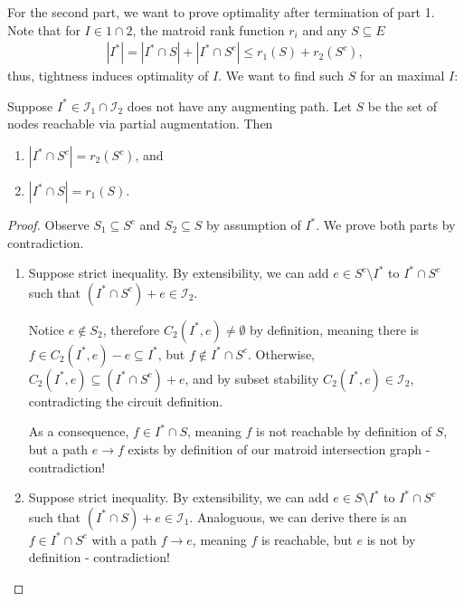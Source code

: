 For the second part, we want to prove optimality after termination of part 1.
Note that for $I \in \mathcal 1 \cap \mathcal 2$, the matroid rank function $r_i$ and any $S \subseteq E$
\begin{align*}
    |I^*| = |I^* \cap S| + |I^* \cap S^c| \leq r_1(S) + r_2(S^c),
\end{align*}
thus, tightness induces optimality of $I$. We want to find such $S$ for an maximal $I$:
\begin{lemma}
    Suppose $I^* \in \mathcal I_1 \cap \mathcal I_2$ does not have any augmenting path.
    Let $S$ be the set of nodes reachable via partial augmentation.
    Then
    \begin{enumerate}
        \item $|I^* \cap S^c| = r_2(S^c)$, and
        \item $|I^* \cap S| = r_1(S)$.
    \end{enumerate}
\end{lemma}
\begin{proof}
    Observe $S_1 \subseteq S^c$ and $S_2 \subseteq S$ by assumption of $I^*$.
    We prove both parts by contradiction.
    \begin{enumerate}
        \item Suppose strict inequality. By extensibility, we can add $e \in S^c \setminus I^*$
              to $I^* \cap S^c$ such that $(I^* \cap S^c) + e \in \mathcal I_2$.

              Notice $e \not \in S_2$, therefore $C_2(I^*, e) \neq \emptyset$ by definition, meaning there
              is $f \in C_2(I^*,e) - e \subseteq I^*$, but $f \not \in I^* \cap S^c$.
              Otherwise, $C_2(I^*,e) \subseteq  (I^* \cap S^c) + e$, and by subset stability $C_2(I^*,e) \in \mathcal I_2$, contradicting the circuit definition.

              As a consequence, $f \in I^* \cap S$, meaning $f$ is not reachable by definition of $S$,
              but a path $e \rightarrow f$ exists by definition of our matroid intersection graph - contradiction!
        \item Suppose strict inequality. By extensibility, we can add $e \in S \setminus I^*$
              to $I^* \cap S^c$ such that $(I^* \cap S) + e \in \mathcal I_1$.
              Analoguous, we can derive there is an $f \in I^* \cap S^c$ with a path $f\rightarrow e$,
              meaning $f$ is reachable, but $e$ is not by definition - contradiction!
    \end{enumerate}
\end{proof}
